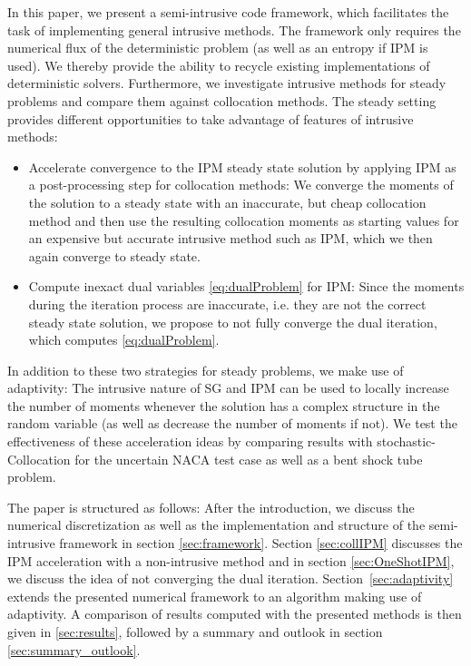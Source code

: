 In this paper, we present a semi-intrusive code framework, which facilitates the task of implementing general intrusive methods. The framework only requires the numerical flux of the deterministic problem (as well as an entropy if IPM is used). We thereby provide the ability to recycle existing implementations of deterministic solvers.
Furthermore, we investigate intrusive methods for steady problems and compare them against collocation methods. The steady setting provides different opportunities to take advantage of features of intrusive methods: 
\begin{itemize}
\item Accelerate convergence to the IPM steady state solution by applying IPM as a post-processing step for collocation methods: We converge the moments of the solution to a steady state with an inaccurate, but cheap collocation method and then use the resulting collocation moments as starting values for an expensive but accurate intrusive method such as IPM, which we then again converge to steady state. 
\item Compute inexact dual variables \eqref{eq:dualProblem} for IPM: Since the moments during the iteration process are inaccurate, i.e. they are not the correct steady state solution, we propose to not fully converge the dual iteration, which computes \eqref{eq:dualProblem}. 
\end{itemize}
In addition to these two strategies for steady problems, we make use of adaptivity: The intrusive nature of SG and IPM can be used to locally increase the number of moments whenever the solution has a complex structure in the random variable (as well as decrease the number of moments if not). We test the effectiveness of these acceleration ideas by comparing results with stochastic-Collocation for the uncertain NACA test case as well as a bent shock tube problem. 

The paper is structured as follows: After the introduction, we discuss the numerical discretization as well as the implementation and structure of the semi-intrusive framework in section \ref{sec:framework}. Section \ref{sec:collIPM} discusses the IPM acceleration with a non-intrusive method and in section \ref{sec:OneShotIPM}, we discuss the idea of not converging the dual iteration. Section~\ref{sec:adaptivity} extends the presented numerical framework to an algorithm making use of adaptivity. A comparison of results computed with the presented methods is then given in \ref{sec:results}, followed by a summary and outlook in section \ref{sec:summary_outlook}.

